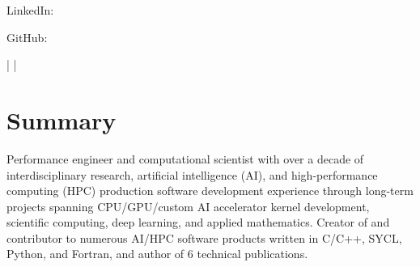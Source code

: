 \documentclass[letterpaper,10pt]{article}
\begin{document}
\href{\AuthorWebsiteLink}{\scshape\huge\Author}\vspace{2pt}

\begin{small}
  LinkedIn: \href{\AuthorLinkedInLink}{\AuthorLinkedInText}

  \vspace{2pt}
  GitHub: \href{\AuthorGitHubLink}{\AuthorGitHubText}

  \vspace{1pt}
  \AuthorAddress{} |
  \href{mailto:\AuthorEmail}{\AuthorEmail} |
  \href{\AuthorPhoneLink}{\AuthorPhoneText}
\end{small}

\section{Summary}
Performance engineer and computational scientist with over a decade of
interdisciplinary research, artificial intelligence (AI), and
high-performance computing (HPC) production software development experience
through long-term projects spanning CPU/GPU/custom AI accelerator kernel
development, scientific computing, deep learning, and applied mathematics.
Creator of and contributor to numerous AI/HPC software products
written in C/C++, SYCL, Python, and Fortran, and author of 6 technical
publications.

\vspace{-196.9pt}
\end{document}
